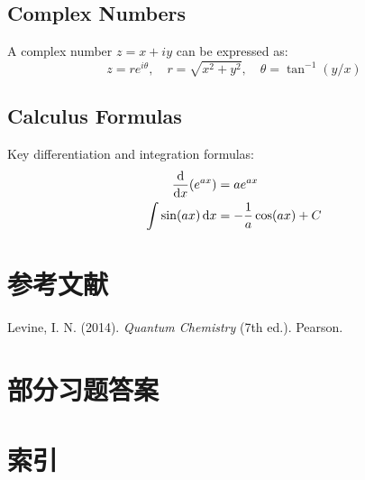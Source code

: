 \documentclass{book}
\begin{document}
	\section{Complex Numbers}
	A complex number $z = x + iy$ can be expressed as:
	\begin{equation}
		z = re^{i\theta}, \quad r = \sqrt{x^2 + y^2}, \quad \theta = \tan^{-1}(y/x)
	\end{equation}
	
	\section{Calculus Formulas}
	Key differentiation and integration formulas:
	\begin{align}
		\dv{x}(e^{ax}) &= ae^{ax} \\
		\int \sin(ax) \dd{x} &= -\frac{1}{a} \cos(ax) + C
	\end{align}
	
	\chapter*{参考文献}
	\begin{thebibliography}{9}
		Levine, I. N. (2014). \emph{Quantum Chemistry} (7th ed.). Pearson.
	\end{thebibliography}
	
	\chapter*{部分习题答案}
	
	
	\chapter*{索引}
	
\end{document}
